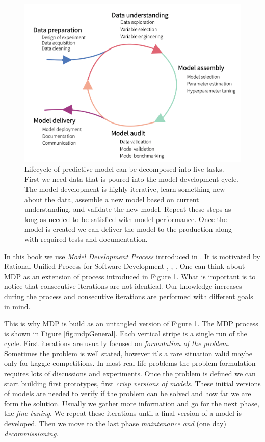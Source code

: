 \documentclass[12pt,]{krantz}
\begin{document}
\begin{figure}

{\centering \includegraphics[width=0.6\linewidth]{figure/MDP_washmachine} 

}

\caption{Lifecycle of predictive model can be decomposed into five tasks. First we need data that is poured into the model development cycle. The model development is highly iterative, learn something new about the data, assemble a new model based on current understanding, and validate the new model. Repeat these steps as long as needed to be satisfied with model performance. Once the model is created we can deliver the model to the production along with required tests and documentation.}\label{fig:MDPwashmachine}
\end{figure}

In this book we use \emph{Model Development Process} introduced in \citep{mdp2019}. It is motivated by Rational Unified Process for Software Development \citep{rup1998}, \citep{usdp1999}, \citep{spiral1988}. One can think about MDP as an extension of process introduced in Figure \ref{fig:MDPwashmachine}. What is important is to notice that consecutive iterations are not identical. Our knowledge increases during the process and consecutive iterations are performed with different goals in mind.

This is why MDP is build as an untangled version of Figure \ref{fig:MDPwashmachine}. The MDP process is shown in Figure \ref{fig:mdpGeneral}. Each vertical stripe is a single run of the cycle.
First iterations are usually focused on \emph{formulation of the problem}. Sometimes the problem is well stated, however it's a rare situation valid maybe only for kaggle competitions. In most real-life problems the problem formulation requires lots of discussions and experiments. Once the problem is defined we can start building first prototypes, first \emph{crisp versions of models}. These initial versions of models are needed to verify if the problem can be solved and how far we are form the solution. Usually we gather more information and go for the next phase, the \emph{fine tuning}. We repeat these iterations until a final version of a model is developed. Then we move to the last phase \emph{maintenance and} (one day) \emph{decommissioning}.
\end{document}
